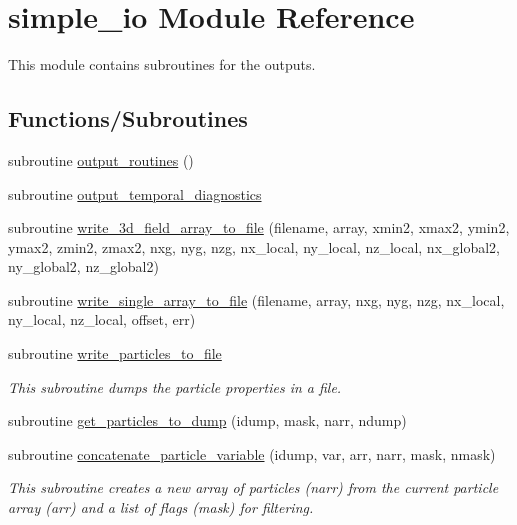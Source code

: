 \hypertarget{namespacesimple__io}{}\section{simple\+\_\+io Module Reference}
\label{namespacesimple__io}


This module contains subroutines for the outputs.  


\subsection*{Functions/\+Subroutines}
\begin{DoxyCompactItemize}
\item 
subroutine \hyperlink{namespacesimple__io_afa460efbda992ca175d786f86ab09ee9}{output\+\_\+routines} ()
\item 
subroutine \hyperlink{namespacesimple__io_acb0fc119c4f9a03b88d4129ec0036e1c}{output\+\_\+temporal\+\_\+diagnostics}
\item 
subroutine \hyperlink{namespacesimple__io_a2100e8a4cfe3bc3c9e2dcc93988d6551}{write\+\_\+3d\+\_\+field\+\_\+array\+\_\+to\+\_\+file} (filename, array,                                                               xmin2, xmax2, ymin2, ymax2, zmin2, zmax2, nxg, nyg, nzg, nx\+\_\+local,                                               ny\+\_\+local, nz\+\_\+local, nx\+\_\+global2, ny\+\_\+global2, nz\+\_\+global2)
\item 
subroutine \hyperlink{namespacesimple__io_a506cc0f775048e27bb5ccd9e936592d3}{write\+\_\+single\+\_\+array\+\_\+to\+\_\+file} (filename, array, nxg, nyg, nzg, nx\+\_\+local, ny\+\_\+local, nz\+\_\+local, offset, err)
\item 
subroutine \hyperlink{namespacesimple__io_a63ed0844b45f6a3402a846a10456fdb7}{write\+\_\+particles\+\_\+to\+\_\+file}
\begin{DoxyCompactList}\small\item\em This subroutine dumps the particle properties in a file. \end{DoxyCompactList}\item 
subroutine \hyperlink{namespacesimple__io_abb3c1220ac70ea28fcbce1cd9c03b294}{get\+\_\+particles\+\_\+to\+\_\+dump} (idump, mask, narr, ndump)
\item 
subroutine \hyperlink{namespacesimple__io_a97c3b871fecd4b1341301fa6cf00a8fa}{concatenate\+\_\+particle\+\_\+variable} (idump, var, arr, narr, mask, nmask)
\begin{DoxyCompactList}\small\item\em This subroutine creates a new array of particles (narr) from the current particle array (arr) and a list of flags (mask) for filtering. \end{DoxyCompactList}\item 

\end{DoxyCompactItemize}
